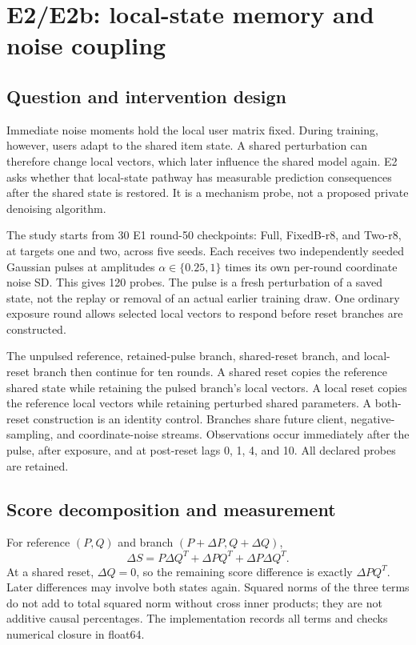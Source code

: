 \section{E2/E2b: local-state memory and noise coupling}
\label{sec:e2}
\subsection{Question and intervention design}
Immediate noise moments hold the local user matrix fixed. During training,
however, users adapt to the shared item state. A shared perturbation can
therefore change local vectors, which later influence the shared model again.
E2 asks whether that local-state pathway has measurable prediction consequences
after the shared state is restored. It is a mechanism probe, not a proposed
private denoising algorithm.

The study starts from 30 E1 round-50 checkpoints: Full, FixedB-r8, and Two-r8,
at targets one and two, across five seeds. Each receives two independently
seeded Gaussian pulses at amplitudes $\alpha\in\{0.25,1\}$ times its own
per-round coordinate noise SD. This gives 120 probes. The pulse is a fresh
perturbation of a saved state, not the replay or removal of an actual earlier
training draw. One ordinary exposure round allows selected local vectors
to respond before reset branches are constructed.

The unpulsed reference, retained-pulse branch, shared-reset branch, and
local-reset branch then continue for ten rounds. A shared reset copies the
reference shared state while retaining the pulsed branch's local vectors.
A local reset copies the reference local vectors while retaining perturbed
shared parameters. A both-reset construction is an identity control.
Branches share future client, negative-sampling, and coordinate-noise streams.
Observations occur immediately after the pulse, after exposure, and at
post-reset lags 0, 1, 4, and 10. All declared probes are retained.

\subsection{Score decomposition and measurement}
For reference $(P,Q)$ and branch $(P+\Delta P,Q+\Delta Q)$,
\begin{equation}
 \Delta S=P\Delta Q^T+\Delta P Q^T+\Delta P\Delta Q^T.
 \label{eq:decompose}
\end{equation}
At a shared reset, $\Delta Q=0$, so the remaining score difference is exactly
$\Delta P Q^T$. Later differences may involve both states again. Squared
norms of the three terms do not add to total squared norm without cross
inner products; they are not additive causal percentages. The implementation
records all terms and checks numerical closure in float64.

